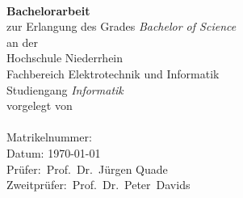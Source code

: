 \begin{titlepage}
	
\begin{center}
		\textbf{\Large \thesisTitle}\\[3cm]
		\textbf{Bachelorarbeit}\\
		zur Erlangung des Grades {\em Bachelor of Science}\\[1.5cm]
		
		an der\\
		Hochschule Niederrhein\\
		Fachbereich Elektrotechnik und Informatik\\
		Studiengang {\em Informatik}\\[3cm]
		
		vorgelegt von\\
		\thesisAuthor\\
		Matrikelnummer: \Matrikelnummer\\[3cm]
		Datum: \today\\[3cm]
		
		Prüfer:~Prof.~Dr.~Jürgen Quade\\
		Zweitprüfer:~Prof.~Dr.~Peter~Davids
	\end{center}
\end{titlepage}